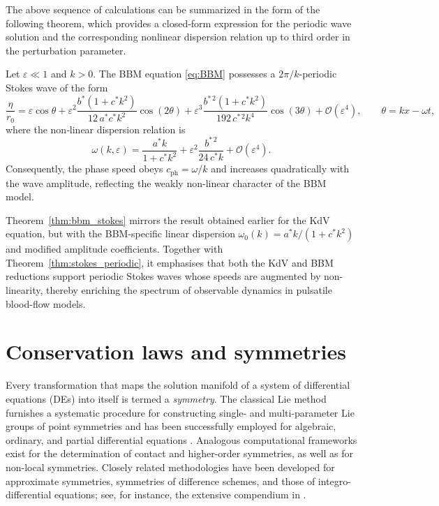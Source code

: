 \documentclass[alpha-refs, 12pt]{wiley-article}
\renewcommand{\O}{\mathcal{O}}
\begin{document}
The above sequence of calculations can be summarized in the form of the following theorem, which provides a closed-form expression for the periodic wave solution and the corresponding nonlinear dispersion relation up to third order in the perturbation parameter.
\begin{theorem}\label{thm:bbm_stokes}
Let $\varepsilon\ll1$ and $k>0$. The BBM equation \eqref{eq:BBM} possesses a $2\pi/k$-periodic Stokes wave of the form
\begin{equation}\label{eq:bbm_eta_series}
  \frac{\eta}{r_{0}}
  =\varepsilon\cos\theta
   +\varepsilon^{2}
      \frac{b^{\ast}(1+c^{\ast}k^{2})}{12\,a^{\ast}c^{\ast}k^{2}}
      \cos(2\theta)
   +\varepsilon^{3}
      \frac{b^{\ast\,2}(1+c^{\ast}k^{2})}{192\,c^{\ast\,2}k^{4}}
      \cos(3\theta)
   +\O(\varepsilon^{4}), \qquad \theta=kx-\omega t,
  \end{equation}
where the non‐linear dispersion relation is
\begin{equation}\label{eq:bbm_dispersion}
  \omega(k,\varepsilon)
  =\frac{a^{\ast}k}{1+c^{\ast}k^{2}}
   +\varepsilon^{2}\frac{b^{\ast\,2}}{24\,c^{\ast}k}
   +\O(\varepsilon^{4}).
\end{equation}
Consequently, the phase speed obeys
\(
  c_{\mathrm{ph}}=\omega/k
\)
and increases quadratically with the wave amplitude, reflecting the weakly non-linear character of the BBM model.
\end{theorem}

Theorem~\ref{thm:bbm_stokes} mirrors the result obtained earlier for the KdV equation, but with the BBM-specific linear dispersion
\(
  \omega_{0}(k)=a^{\ast}k/(1+c^{\ast}k^{2})
\)
and modified amplitude coefficients. Together with Theorem~\ref{thm:stokes_periodic}, it emphasises that both the KdV and BBM reductions support periodic Stokes waves whose speeds are augmented by non-linearity, thereby enriching the spectrum of observable dynamics in pulsatile blood-flow models.

\section{Conservation laws and symmetries}
\label{sec:cons_sym}

Every transformation that maps the solution manifold of a system of differential equations (DEs) into itself is termed a \emph{symmetry}. The classical Lie method furnishes a systematic procedure for constructing single- and multi-parameter Lie groups of point symmetries and has been successfully employed for algebraic, ordinary, and partial differential equations \cite{Cheviakov2007}. Analogous computational frameworks exist for the determination of contact and higher-order symmetries, as well as for non-local symmetries. Closely related methodologies have been developed for approximate symmetries, symmetries of difference schemes, and those of integro-differential equations; see, for instance, the extensive compendium in \cite{Ibragimov1995}.
\end{document}
